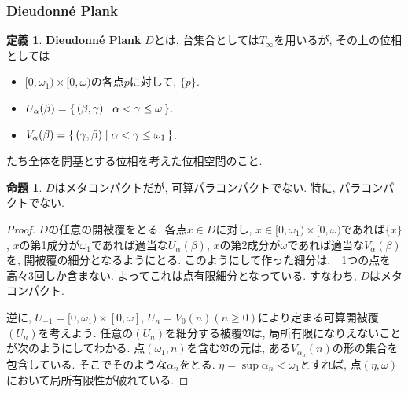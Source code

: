 \documentclass[a4paper, twoside]{bxjsarticle}
\theoremstyle{definition}
\newtheorem{prop}[thm]{命題}
\newtheorem{defn}[thm]{定義}
\begin{document}
    \subsubsection{Dieudonné Plank}
        \begin{defn}
            \textbf{Dieudonné Plank} $D$とは, 台集合としては$T_\infty$を用いるが, その上の位相としては
            \begin{itemize}
                \item $[0, \omega_1)\times[0, \omega)$の各点$p$に対して, $\{p\}$.
                \item $U_\alpha(\beta)=\set{(\beta, \gamma)|\alpha<\gamma\leq\omega}$.
                \item $V_\alpha(\beta)=\set{(\gamma, \beta)|\alpha<\gamma\leq\omega_1}$.
            \end{itemize}
            たち全体を開基とする位相を考えた位相空間のこと.
        \end{defn}
        \begin{prop}
            $D$はメタコンパクトだが, 可算パラコンパクトでない. 特に, パラコンパクトでない.
        \end{prop}
        \begin{proof}
            $D$の任意の開被覆をとる. 各点$x\in D$に対し, $x\in [0, \omega_1)\times[0, \omega)$であれば$\{x\}$, $x$の第1成分が$\omega_1$であれば適当な$U_\alpha(\beta)$, $x$の第2成分が$\omega$であれば適当な$V_\alpha(\beta)$を, 開被覆の細分となるようにとる. このようにして作った細分は,　1つの点を高々3回しか含まない. よってこれは点有限細分となっている. すなわち, $D$はメタコンパクト.
            
            逆に, $U_{-1} = [0, \omega_1)\times [0, \omega]$, $U_n = V_0(n) (n\geq 0)$により定まる可算開被覆$(U_n)$を考えよう. 任意の$(U_n)$を細分する被覆$\mathfrak{V}$は, 局所有限になりえないことが次のようにしてわかる. 点$(\omega_1, n)$を含む$\mathfrak{V}$の元は, ある$V_{\alpha_n}(n)$の形の集合を包含している. そこでそのような$\alpha_n$をとる. $\eta = \sup \alpha_n<\omega_1$とすれば, 点$(\eta, \omega)$において局所有限性が破れている.
        \end{proof}
    \newpage
    
\end{document}
